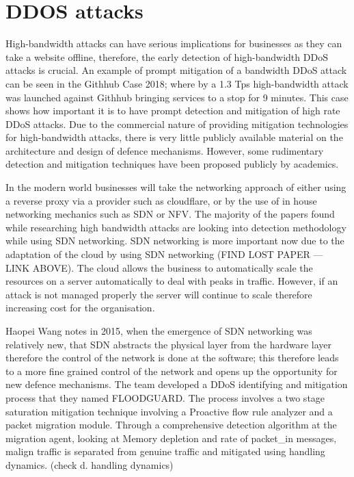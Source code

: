 
\section{DDOS attacks} \label{attack2}

High-bandwidth attacks can have serious implications for businesses as they can take a website offline, therefore, the early detection of high-bandwidth DDoS attacks is crucial. An example of prompt mitigation of a bandwidth DDoS attack can be seen in the Githhub Case 2018; where by a 1.3 Tps high-bandwidth attack was launched against Githhub bringing services to a stop for 9 minutes. \cite{Githhubattacks} This case shows how important it is to have prompt detection and mitigation of high rate DDoS attacks. Due to the commercial nature of providing mitigation technologies for high-bandwidth attacks, there is very little publicly available material on the architecture and design of defence mechanisms. However, some rudimentary detection and mitigation techniques have been proposed publicly by academics. 

In the modern world businesses will take the networking approach of either using a reverse proxy via a provider such as cloudflare, or by the use of in house networking mechanics such as SDN or NFV. The majority of the papers found while researching high bandwidth attacks are looking into detection methodology while using SDN networking. SDN networking is more important now due to the adaptation of the cloud by using SDN networking (FIND LOST PAPER --- LINK ABOVE). The cloud allows the business to automatically scale the resources on a server automatically to deal with peaks in traffic. However, if an attack is not managed properly the server will continue to scale therefore increasing cost for the organisation. 

Haopei Wang notes in 2015, when the emergence of SDN networking was relatively new, that SDN abstracts the physical layer from the hardware layer therefore the control of the network is done at the software; this therefore leads to a more fine grained control of the network and opens up the opportunity for new defence mechanisms. The team developed a DDoS identifying and mitigation process that they named FLOODGUARD. The process involves a two stage saturation mitigation technique involving a Proactive flow rule analyzer and a packet migration module. Through a comprehensive detection algorithm at the migration agent, looking at Memory depletion and rate of packet\_in messages, malign traffic is separated from genuine traffic and mitigated using handling dynamics. (check d. handling dynamics)


